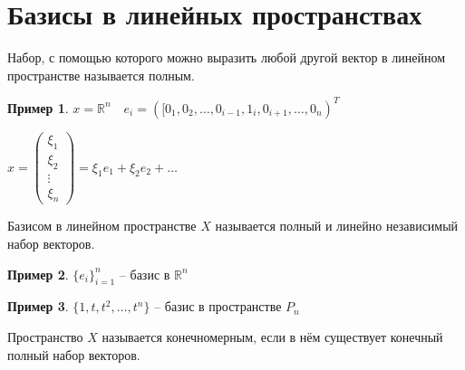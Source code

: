 \documentclass{book}
\newcommand\R{\ensuremath{\mathbb{R}}}
\theoremstyle{definition}
\newtheorem*{example}{Пример}
\begin{document}
 \section{Базисы в линейных пространствах}
 \begin{definition}
     Набор, с помощью которого можно выразить любой другой вектор в линейном пространстве называется полным.
 \end{definition}

 \begin{example}
     $x = \R^n\quad e_i = \left( [0_1, 0_2, \ldots, 0_{i-1}, 1_i, 0_{i+1}, \ldots, 0_n \right)^T$

     $x = \begin{pmatrix} \xi_1\\ \xi_2 \\ \vdots \\ \xi_n \end{pmatrix} = \xi_1e_1 + \xi_2e_2 + \ldots$
 \end{example}

 \begin{definition}
     Базисом в линейном пространстве $X$ называется полный и линейно независимый набор векторов. 
 \end{definition}

 \begin{example}
     $\{e_i\}_{i=1}^n$ -- базис в  $\R^n$
 \end{example}

 \begin{example}
     $\{1, t, t^2, \ldots, t^n\}$ -- базис в пространстве $P_n$
 \end{example}

 \begin{definition}
     Пространство $X$ называется конечномерным, если в нём существует конечный полный набор векторов. 
 \end{definition}
\end{document}
